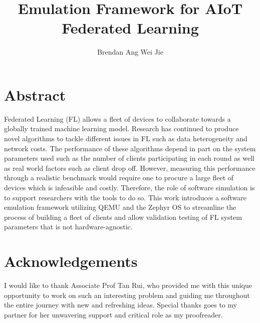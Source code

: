 \documentclass[12pt]{article}
\title{Emulation Framework for AIoT Federated Learning}
\author{Brendan Ang Wei Jie}
\begin{document}
\maketitle

\pagebreak
\section{Abstract}
Federated Learning (FL) allows a fleet of devices to collaborate towards a globally trained machine
learning model. Research has continued to produce novel algorithms to tackle
different issues in FL such as data heterogeneity and network costs. The performance
of these algorithms depend in part on the system parameters used
such as the number of clients participating in each round as well as real world factors such as
client drop off. However, measuring this performance through a realistic benchmark would require
one to procure a large fleet of devices which is infeasible and costly. Therefore, the role of
software simulation is to support researchers with the tools to do so. This work introduces a
software emulation framework utilizing QEMU and the Zephyr OS to
streamline the process of building a fleet of clients and allow validation testing of FL system
parameters that is not hardware-agnostic.
\pagebreak
  \section{Acknowledgements}
  I would like to thank Associate Prof Tan Rui, who provided me with this unique opportunity to work
  on such an interesting problem and guiding me throughout the entire journey with new and
  refreshing ideas. Special thanks goes to my
  partner for her unwavering support and critical role as my proofreader.
\pagebreak
\tableofcontents
\listoffigures
\pagebreak
\end{document}
